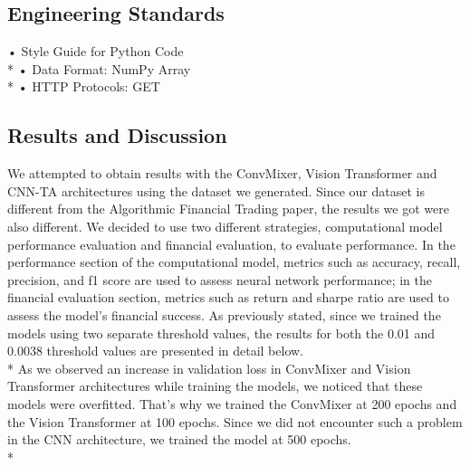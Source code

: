 \documentclass[]{article}
\begin{document}
\subsection{Engineering Standards}
• Style Guide for Python Code\\*
• Data Format: NumPy Array\\*
• HTTP Protocols: GET

\begin{center}
    \item\section{Results and Discussion}
\end{center}
We attempted to obtain results with the ConvMixer, Vision Transformer and CNN-TA architectures using the dataset we generated. Since our dataset is different from the Algorithmic Financial Trading paper, the results we got were also different. We decided to use two different strategies, computational model performance evaluation and financial evaluation, to evaluate performance. In the performance section of the computational model, metrics such as accuracy, recall, precision, and f1 score are used to assess neural network performance; in the financial evaluation section, metrics such as return and sharpe ratio are used to assess the model's financial success. As previously stated, since we trained the models using two separate threshold values, the results for both the 0.01 and 0.0038 threshold values are presented in detail below. \vspace{0.2cm} \\*
As we observed an increase in validation loss in ConvMixer and Vision Transformer architectures while training the models, we noticed that these models were overfitted. That's why we trained the ConvMixer at 200 epochs and the Vision Transformer at 100 epochs. Since we did not encounter such a problem in the CNN architecture, we trained the model at 500 epochs. \vspace{0.2cm}\\*

\end{document}
